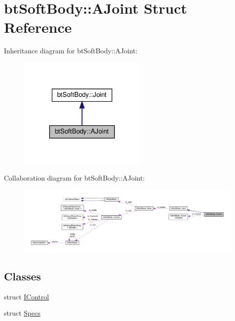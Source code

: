 \hypertarget{structbtSoftBody_1_1AJoint}{}\section{bt\+Soft\+Body\+:\+:A\+Joint Struct Reference}
\label{structbtSoftBody_1_1AJoint}


Inheritance diagram for bt\+Soft\+Body\+:\+:A\+Joint\+:
\nopagebreak
\begin{figure}[H]
\begin{center}
\leavevmode
\includegraphics[width=179pt]{structbtSoftBody_1_1AJoint__inherit__graph}
\end{center}
\end{figure}


Collaboration diagram for bt\+Soft\+Body\+:\+:A\+Joint\+:
\nopagebreak
\begin{figure}[H]
\begin{center}
\leavevmode
\includegraphics[width=350pt]{structbtSoftBody_1_1AJoint__coll__graph}
\end{center}
\end{figure}
\subsection*{Classes}
\begin{DoxyCompactItemize}
\item 
struct \hyperlink{structbtSoftBody_1_1AJoint_1_1IControl}{I\+Control}
\item 
struct \hyperlink{structbtSoftBody_1_1AJoint_1_1Specs}{Specs}
\end{DoxyCompactItemize}
